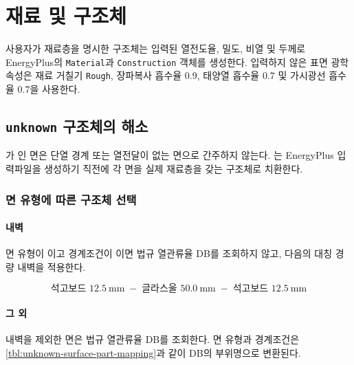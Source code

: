 \section{재료 및 구조체}

사용자가 재료층을 명시한 구조체는 입력된 열전도율, 밀도, 비열 및 두께로 EnergyPlus의 \texttt{Material}과 \texttt{Construction} 객체를 생성한다. 입력하지 않은 표면 광학속성은 재료 거칠기 \texttt{Rough}, 장파복사 흡수율 0.9, 태양열 흡수율 0.7 및 가시광선 흡수율 0.7을 사용한다.

\subsection{\texttt{unknown} 구조체의 해소}

가 인 면은 단열 경계 또는 열전달이 없는 면으로 간주하지 않는다. \simulator 는 EnergyPlus 입력파일을 생성하기 직전에 각  면을 실제 재료층을 갖는 구조체로 치환한다.

\subsubsection{면 유형에 따른 구조체 선택}

\paragraph{내벽}
면 유형이 이고 경계조건이 이면 법규
열관류율 DB를 조회하지 않고, 다음의 대칭 경량 내벽을 적용한다.

\[
  \text{석고보드 }12.5\ \mathrm{mm}
  \;-\;
  \text{글라스울 }50.0\ \mathrm{mm}
  \;-\;
  \text{석고보드 }12.5\ \mathrm{mm}
\]

\paragraph{그 외}
내벽을 제외한  면은 법규 열관류율 DB를 조회한다. 면 유형과 경계조건은 \cref{tbl:unknown-surface-part-mapping}과 같이 DB의 부위명으로 변환된다.

